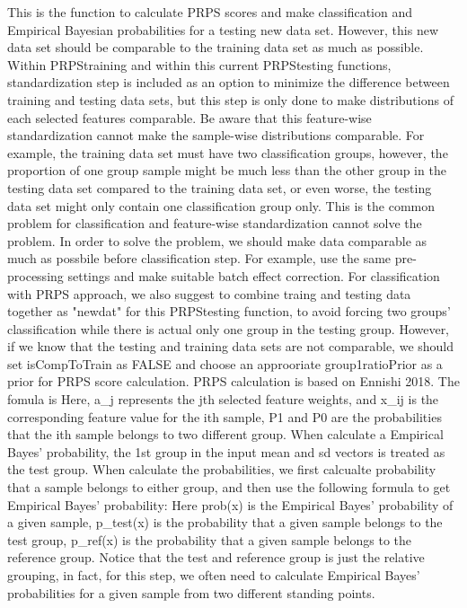 \documentclass[letterpaper]{book}
\begin{document}
%
\begin{Details}\relax
This is the function to calculate PRPS scores and make classification and Empirical Bayesian 
probabilities for a testing new data set. However, this new data set should be comparable to 
the training data set as much as possible. Within PRPStraining and within this current PRPStesting functions, 
standardization step is included as an option to minimize the difference between training and testing data sets, 
but this step is only done to make distributions of each selected features comparable. 
Be aware that this feature-wise standardization cannot make the sample-wise distributions comparable. 
For example, the training data set must have two classification groups, however, the proportion of one group sample
might be much less than the other group in the testing data set compared to the training data set, or even worse, 
the testing data set might only contain one classification group only. This is the common problem for classification 
and feature-wise standardization cannot solve the problem. 
In order to solve the problem, we should make data comparable as much as possbile before classification step. 
For example, use the same pre-processing settings and make suitable batch effect correction. 
For classification with PRPS approach, we also suggest to combine traing and testing data together as "newdat" 
for this PRPStesting function, to avoid forcing two groups' classification while there is actual only one group
in the testing group.
However, if we know that the testing and training data sets are not comparable, we should set isCompToTrain as
FALSE and choose an approoriate group1ratioPrior as a prior for PRPS score calculation. 
PRPS calculation is based on Ennishi 2018. The fomula is 
Here, a\_j represents the jth selected feature weights, and x\_ij is the corresponding feature value for the ith sample, P1 and P0 are the probabilities that the ith sample belongs to two different group.
When calculate a Empirical Bayes' probability, the 1st group in the input mean and sd vectors is treated as
the test group. When calculate the probabilities, we first calcualte probability that a sample belongs to either group, 
and then use the following formula to get Empirical Bayes' probability:
Here prob(x) is the Empirical Bayes' probability of a given sample, p\_test(x) is the probability that a given sample 
belongs to the test group, p\_ref(x) is the probability that a given sample belongs to the reference group.
Notice that the test and reference group is just the relative grouping, in fact, for this step, 
we often need to calculate Empirical Bayes' probabilities for a given sample from two different standing points.
\end{Details}
\end{document}
